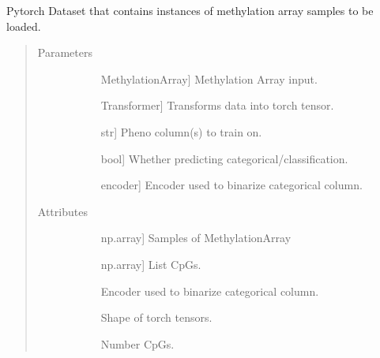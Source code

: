 \documentclass[letterpaper,10pt,english]{sphinxmanual}
\begin{document}
\begin{fulllineitems}
\label{\detokenize{index:methylnet.datasets.MethylationDataSet}}
Pytorch Dataset that contains instances of methylation array samples to be loaded.
\begin{quote}\begin{description}
\item[{Parameters}] \leavevmode\begin{description}
\item[{}] \leavevmode{[}MethylationArray{]}
Methylation Array input.

\item[{}] \leavevmode{[}Transformer{]}
Transforms data into torch tensor.

\item[{}] \leavevmode{[}str{]}
Pheno column(s) to train on.

\item[{}] \leavevmode{[}bool{]}
Whether predicting categorical/classification.

\item[{}] \leavevmode{[}encoder{]}
Encoder used to binarize categorical column.

\end{description}

\item[{Attributes}] \leavevmode\begin{description}
\item[{}] \leavevmode{[}np.array{]}
Samples of MethylationArray

\item[{}] \leavevmode{[}np.array{]}
List CpGs.

\item[{}] \leavevmode
Encoder used to binarize categorical column.

\item[{}] \leavevmode
Shape of torch tensors.

\item[{}] \leavevmode
Number CpGs.


\end{description}
\end{description}
\end{quote}
\end{fulllineitems}
\end{document}
